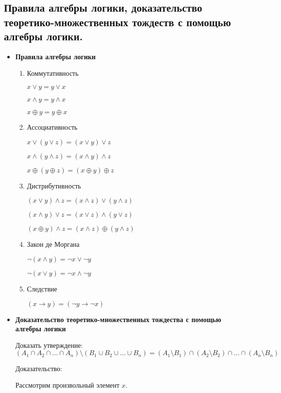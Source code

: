 \subsection{Правила алгебры логики, доказательство теоретико-множественных тождеств с помощью алгебры логики.}

\begin{itemize}
	\item \textbf{Правила алгебры логики}
	\begin{enumerate}
		\item Коммутативность
		
		$x \vee y = y \vee x$
		
		$x \wedge y = y \wedge x$
		
		$x \oplus y = y \oplus x$

		\item Ассоциативность
		
		$x \vee (y \vee z)  = (x \vee y) \vee z$
		
		$x \wedge (y \wedge z)  = (x \wedge y) \wedge z$
		
		$x \oplus (y \oplus z)  = (x \oplus y) \oplus z$
		
		\item Дистрибутивность
		
		$(x \vee y) \wedge z = (x \wedge z) \vee (y \wedge z)$
		
		$(x \wedge y) \vee z = (x \vee z) \wedge (y \vee z)$
		
		$(x \oplus y) \wedge z = (x \wedge z) \oplus (y \wedge z)$
		
		\item Закон де Моргана
		
		$\neg(x \wedge y) = \neg x \vee \neg y$
		
		$\neg(x \vee y) = \neg x \wedge \neg y$
		
		\item Следствие
		
		$(x \to y) = (\neg y \to \neg x)$
	\end{enumerate}
	
	\item \textbf{Доказательство теоретико-множественных тождества с помощью алгебры логики}
	
	Доказать утверждение: $(A_1 \cap A_2 \cap ... \cap A_n) \setminus (B_1 \cup B_2 \cup ... \cup B_n) = (A_1 \setminus B_1) \cap (A_2 \setminus B_2) \cap ... \cap (A_n \setminus B_n)$
	
	Доказательство:
	
	Рассмотрим произвольный элемент $x$.
	

\end{itemize}
